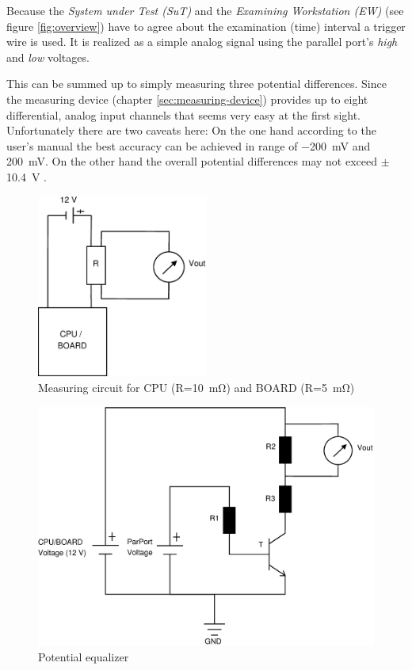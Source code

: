Because the \emph{System under Test (SuT)} and the \emph{Examining
Workstation (EW)} (see figure \ref{fig:overview}) have to agree about the
examination (time) interval a trigger wire is used. It is realized as a simple
analog signal using the parallel port's \emph{high} and \emph{low} voltages.

This can be summed up to simply measuring three potential differences. Since the
measuring device (chapter \ref{sec:measuring-device}) provides up to eight
differential, analog input channels that seems very easy at the first sight.
Unfortunately there are two caveats here: On the one hand according to the
user's manual \cite{NIManual2009} the best accuracy can be achieved in range of
\SI{-200}{\milli\volt} and \SI{200}{\milli\volt}. On the other hand the overall
potential differences may not exceed $\pm$\SI{10.4}{\volt}
\cite{NISpec2009}.

\begin{figure}
  \centering
    \includegraphics[width=0.5\textwidth]{fig/measuring-circuit.eps}
  \caption{Measuring circuit for CPU (R=\SI{10}{\milli\ohm}) and BOARD
(R=\SI{5}{\milli\ohm})}
  \label{fig:circuit}
\end{figure}

\begin{figure}
  \centering
    \includegraphics[width=\textwidth]{fig/potential-equalizer.eps}
  \caption{Potential equalizer}
  \label{fig:potential-equalizer}
\end{figure}

